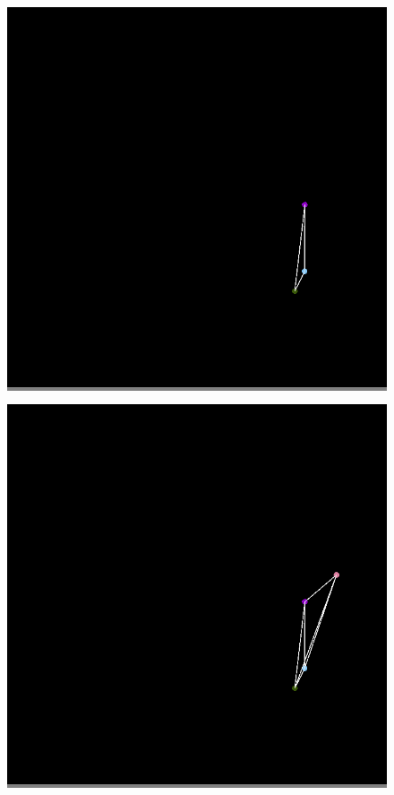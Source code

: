 \documentclass{article}
\begin{document}
\begin{figure}
\begin{minipage}{0.2\textwidth}
            \end{minipage}
            \hspace{\fill}
            \begin{minipage}{0.2\textwidth}
            \colorbox{gray}{\includegraphics[width=\linewidth]{./images/color-3.png}}
            \end{minipage}
            \hspace{\fill}
            \begin{minipage}{0.2\textwidth}
            \colorbox{gray}{\includegraphics[width=\linewidth]{./images/color-4.png}}

\end{minipage}
\end{figure}
\end{document}
